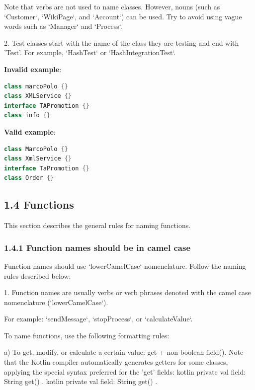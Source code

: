 Note that verbs are not used to name classes. However, nouns (such as `Customer`, `WikiPage`, and `Account`) can be used. Try to avoid using vague words such as `Manager` and `Process`.



2.	Test classes start with the name of the class they are testing and end with 'Test'. For example, `HashTest` or `HashIntegrationTest`.



\textbf{Invalid example}: 

\begin{lstlisting}[language=Kotlin]
class marcoPolo {} 
class XMLService {} 
interface TAPromotion {}
class info {}
\end{lstlisting}


\textbf{Valid example}: 

\begin{lstlisting}[language=Kotlin]
class MarcoPolo {}
class XmlService {}
interface TaPromotion {}
class Order {}
\end{lstlisting}


\subsection*{\textbf{1.4 Functions}}

This section describes the general rules for naming functions.

\subsubsection*{\textbf{1.4.1 Function names should be in camel case}}
\leavevmode\newline

Function names should use `lowerCamelCase` nomenclature. Follow the naming rules described below:

1.	Function names are usually verbs or verb phrases denoted with the camel case nomenclature (`lowerCamelCase`).

For example: `sendMessage`, `stopProcess`, or `calculateValue`.

To name functions, use the following formatting rules:



a) To get, modify, or calculate a certain value: get + non-boolean field(). Note that the Kotlin compiler automatically generates getters for some classes, applying the special syntax preferred for the 'get' fields: kotlin private val field: String get() { }. kotlin private val field: String get() { }.


